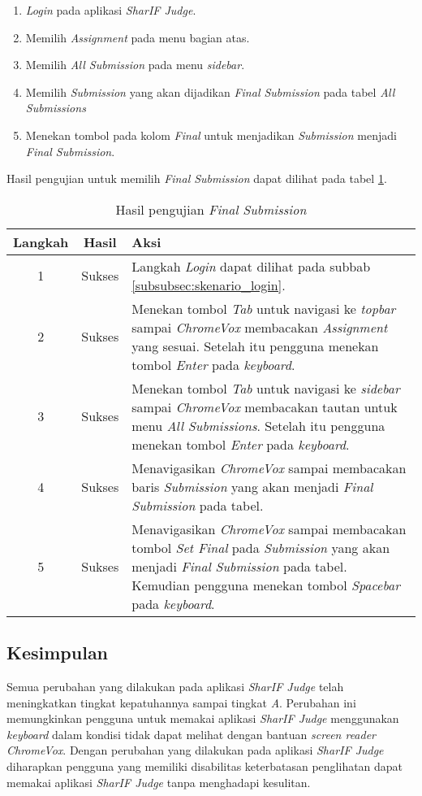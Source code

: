 \begin{enumerate}
	\item \textit{Login} pada aplikasi \textit{SharIF Judge}.
	\item Memilih \textit{Assignment} pada menu bagian atas.
	\item Memilih \textit{All Submission} pada menu \textit{sidebar}.
	\item Memilih \textit{Submission} yang akan dijadikan \textit{Final Submission} pada tabel \textit{All Submissions}
	\item Menekan tombol pada kolom \textit{Final} untuk menjadikan \textit{Submission} menjadi \textit{Final Submission}.
\end{enumerate}

Hasil pengujian untuk memilih \textit{Final Submission} dapat dilihat pada tabel \ref{tab:hasil_final_submission}.

\begin{table}[H]
	\centering
	\caption{Hasil pengujian \textit{Final Submission}}
	\label{tab:hasil_final_submission}
	\begin{tabular}{|c|c|p{12cm}|}
		\toprule
		Langkah & Hasil & Aksi\\
		\midrule
		1 & Sukses & Langkah \textit{Login} dapat dilihat pada subbab \ref{subsubsec:skenario_login}.\\
		2 & Sukses & Menekan tombol \textit{Tab} untuk navigasi ke \textit{topbar} sampai \textit{ChromeVox} membacakan \textit{Assignment} yang sesuai. Setelah itu pengguna menekan tombol \textit{Enter} pada \textit{keyboard}.\\
		3 & Sukses & Menekan tombol \textit{Tab} untuk navigasi ke \textit{sidebar} sampai \textit{ChromeVox} membacakan tautan untuk menu \textit{All Submissions}. Setelah itu pengguna menekan tombol \textit{Enter} pada \textit{keyboard}.\\
		4 & Sukses & Menavigasikan \textit{ChromeVox} sampai membacakan baris \textit{Submission} yang akan menjadi \textit{Final Submission} pada tabel.\\
		5 & Sukses & Menavigasikan \textit{ChromeVox} sampai membacakan tombol \textit{Set Final} pada \textit{Submission} yang akan menjadi \textit{Final Submission} pada tabel. Kemudian pengguna menekan tombol \textit{Spacebar} pada \textit{keyboard}.\\
		\bottomrule
	\end{tabular}
\end{table}

\subsection{Kesimpulan}
\label{subsec:kesimpulan_pengujian}

Semua perubahan yang dilakukan pada aplikasi \textit{SharIF Judge} telah meningkatkan tingkat kepatuhannya sampai tingkat \textit{A}. Perubahan ini memungkinkan pengguna untuk memakai aplikasi \textit{SharIF Judge} menggunakan \textit{keyboard} dalam kondisi tidak dapat melihat dengan bantuan \textit{screen reader ChromeVox}. Dengan perubahan yang dilakukan pada aplikasi \textit{SharIF Judge} diharapkan pengguna yang memiliki disabilitas keterbatasan penglihatan dapat memakai aplikasi \textit{SharIF Judge} tanpa menghadapi kesulitan.